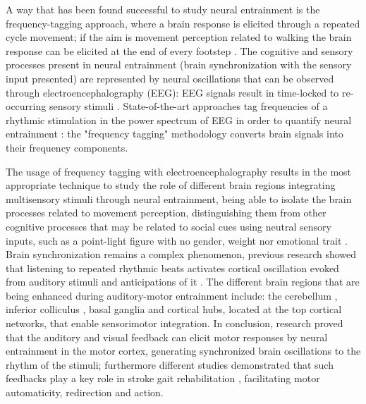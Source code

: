 A way that has been found successful to study neural entrainment is the frequency-tagging approach, where a brain response is elicited through a repeated cycle movement; if the aim is movement perception related to walking the brain response can be elicited at the end of every footstep \parencite{Cracco_2022}. The cognitive and sensory processes present in neural entrainment (brain synchronization with the sensory input presented) are represented by neural oscillations that can be observed through electroencephalography (EEG): EEG signals result in time-locked to re-occurring sensory stimuli \parencite{Thut_2012}. 
State-of-the-art approaches tag frequencies of a rhythmic stimulation in the power spectrum of EEG in order to quantify neural entrainment \parencite{Nozaradan_2011}: the "frequency tagging" methodology converts brain signals into their frequency components. 

The usage of frequency tagging with electroencephalography results in the most appropriate technique to study the role of different brain regions integrating multisensory stimuli through neural entrainment, being able to isolate the brain processes related to movement perception, distinguishing them from other cognitive processes that may be related to social cues using neutral sensory inputs, such as a point-light figure with no gender, weight nor emotional trait \parencite{Cracco_2022}. 
Brain synchronization remains a complex phenomenon, previous research showed that listening to repeated rhythmic beats activates cortical oscillation evoked from auditory stimuli and anticipations of it \parencite{Snyder_2005}. The different brain regions that are being enhanced during auditory-motor entrainment include: the cerebellum \parencite{Grahn_2011}, inferior colliculus \parencite{Tierney_2013}, basal ganglia \parencite{Thaut_2009} and cortical hubs, located at the top cortical networks, that enable sensorimotor integration. 
In conclusion, research proved that the auditory and visual feedback can elicit motor responses by neural entrainment in the motor cortex, generating synchronized brain oscillations to the rhythm of the stimuli; furthermore different studies demonstrated that such feedbacks play a key role in stroke gait rehabilitation \parencite{Chen_2018,Bolognini_2016}, facilitating motor automaticity, redirection and action. 

